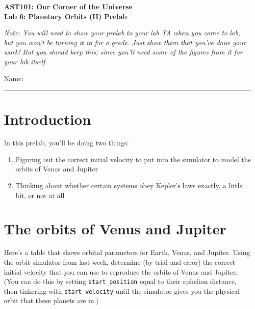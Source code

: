 \documentclass[11pt]{article}
\begin{document}
\begin{center}
\textbf{\Large
AST101: Our Corner of the Universe \\
\vspace*{0.1cm}
Lab 6: Planetary Orbits (II) Prelab
}

\normalsize
\it Note: You will need to show your prelab to your lab TA when you come to lab, but you won't be turning it in for a grade. Just show them that you've done your work! But you should keep this, since you'll need some of the figures from it for your
lab itself.
\end{center}

\vspace*{0.5cm}

{\Large Name:}\vspace*{0.5cm}\\\hrule

\vspace*{0.5cm}

\section{Introduction}

In this prelab, you'll be doing two things:

\begin{enumerate}
	\item Figuring out the correct initial velocity to put into the simulator to model the orbits of Venus and Jupiter
	\item Thinking about whether certain systems obey Kepler's laws exactly, a little bit, or not at all
\end{enumerate}


\section{The orbits of Venus and Jupiter}

Here's a table that shows orbital parameters for Earth, Venus, and Jupiter. Using the orbit simulator from last week, determine (by trial and error) the correct initial velocity that you can use to reproduce the orbits of Venus and Jupiter. (You can do this by setting {\tt start\_position} equal to their aphelion distance, then tinkering with {\tt start\_velocity} until the simulator gives you the physical orbit that these planets are in.)
\end{document}
